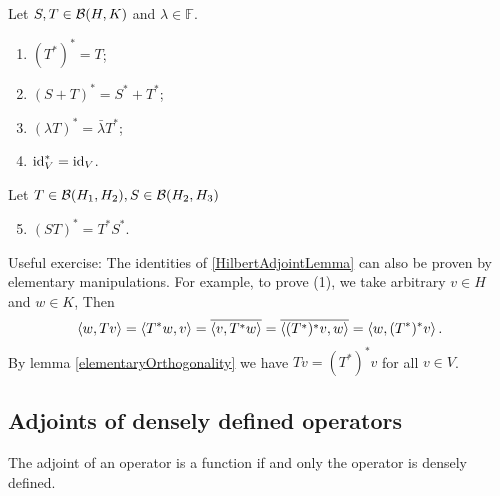 \begin{lemma} \label{HilbertAdjointLemma}
Let $S,T\in\operatorname{\mathcal{B}}(H,K)$ and $\lambda \in \mathbb{F}$.
\begin{enumerate}
\item $(T^*)^* = T$;
\item $(S+T)^* = S^* + T^*$;
\item $(\lambda T)^* = \bar{\lambda}T^*$;
\item $\operatorname{id}_V^* = \operatorname{id}_V$.
\end{enumerate}
Let $T\in\operatorname{\mathcal{B}}(H_1,H_2), S\in\operatorname{\mathcal{B}}(H_2,H_3)$
\begin{enumerate}
\setcounter{enumi}{4}
\item $(ST)^* = T^*S^*$.
\end{enumerate}
\end{lemma}

\begin{note}
Useful exercise: The identities of \ref{HilbertAdjointLemma} can also be proven by elementary manipulations. For example, to prove (1), we take arbitrary $v\in H$ and $w\in K$, Then
\[ \left\langle w,Tv \right\rangle = \left\langle T^*w,v \right\rangle = \overline{\left\langle v,T^*w \right\rangle} = \overline{\left\langle (T^*)^*v,w \right\rangle} = \left\langle w, (T^*)^*v \right\rangle. \]
By lemma \ref{elementaryOrthogonality} we have $Tv = (T^*)^*v$ for all $v\in V$. 
\end{note}

\subsection{Adjoints of densely defined operators}
The adjoint of an operator is a function if and only the operator is densely defined.


